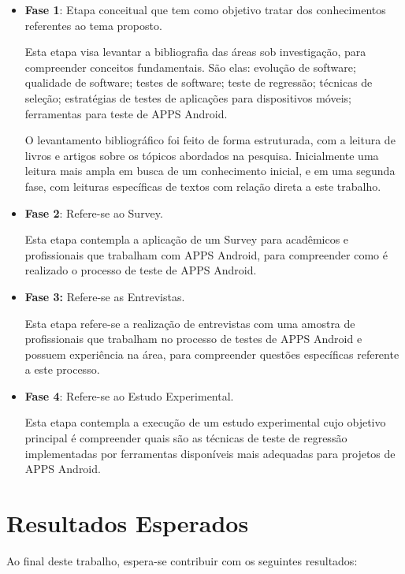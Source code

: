 \begin{itemize}
  \item \textbf{Fase 1}: Etapa conceitual que tem como objetivo tratar dos conhecimentos referentes ao tema proposto.
  
  
  Esta etapa visa levantar a bibliografia das áreas sob investigação, para compreender conceitos fundamentais. São elas: evolução de software; qualidade de software; testes de software; teste de regressão; técnicas de seleção; estratégias de testes de aplicações para dispositivos móveis; ferramentas para teste de \ac{APPS} Android.
  
  O levantamento bibliográfico foi feito de forma estruturada, com a leitura de livros e artigos sobre os tópicos abordados na pesquisa. Inicialmente uma leitura mais ampla em busca de um conhecimento inicial, e em uma segunda fase, com leituras específicas de textos com relação direta a este trabalho.
  
  \item \textbf{Fase 2}: Refere-se ao Survey.
  
  Esta etapa contempla a aplicação de um Survey para acadêmicos e profissionais que trabalham com \ac{APPS} Android, para compreender como é realizado o processo de teste de \ac{APPS} Android.
  
  \item \textbf{Fase 3:} Refere-se as Entrevistas.
  
  Esta etapa refere-se a realização de entrevistas com uma amostra de profissionais que trabalham no processo de testes de \ac{APPS} Android e possuem experiência na área, para compreender questões específicas referente a este processo.
  
  \item \textbf{Fase 4}: Refere-se ao Estudo Experimental.
  
  Esta etapa contempla a execução de um estudo experimental cujo objetivo principal é compreender quais são as técnicas de teste de regressão implementadas por ferramentas disponíveis mais adequadas para projetos de \ac{APPS} Android. 
  
\end{itemize}

\section{Resultados Esperados}\label{sec:resultadosesperados}

Ao final deste trabalho, espera-se contribuir com os seguintes resultados:


